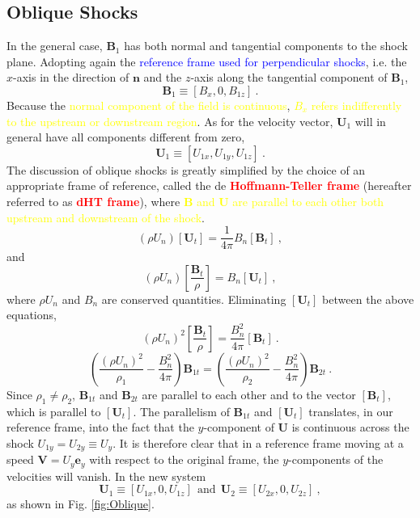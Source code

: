 \documentclass[12pt,a4paper]{article}
\renewcommand{\vec}[1]{\boldsymbol{#1}}
\begin{document}
\subsection{Oblique Shocks}
\cite{2015bps..book.....C} In the general case, $\vec{B}_1$ has both normal and tangential components to the shock plane. Adopting again the \textcolor{blue}{reference frame used for perpendicular shocks}, i.e. the $x$-axis in the direction of $\vec{n}$ and the $z$-axis along the tangential component of $\vec{B}_1$,
\begin{equation}
\vec{B}_1 \equiv [B_x, 0, B_{1z}] ~.
\end{equation}
Because the \textcolor{yellow}{normal component of the field is continuous}, \textcolor{yellow}{$B_x$ refers indifferently to the upstream or downstream region}. As for the velocity vector, $\vec{U}_1$ will in general have all components different from zero,
\begin{equation*}
\vec{U}_1 \equiv [U_{1x}, U_{1y}, U_{1z}] ~.
\end{equation*}
The discussion of oblique shocks is greatly simplified by the choice of an appropriate frame of reference, called the de \textcolor{red}{\bf Hoffmann-Teller frame} (hereafter referred to as \textcolor{red}{\bf dHT frame}), where \textcolor{yellow}{$\vec{B}$ and $\vec{U}$ are parallel to each other both upstream and downstream of the shock}. 
\begin{equation}
(\rho U_n) [\vec{U}_t] = \dfrac{1}{4\pi} B_n [\vec{B}_t] ~,
\end{equation}
and 
\begin{equation}
(\rho U_n) \left[\dfrac{\vec{B}_t}{\rho} \right] = B_n [\vec{U}_t] ~,
\end{equation}
where $\rho U_n$ and $B_n$ are conserved quantities. Eliminating $[\vec{U}_t]$ between the above equations, 
\begin{equation}
(\rho U_n)^2 \left[\dfrac{\vec{B}_t}{\rho} \right] = \dfrac{B_n^2}{4\pi} [\vec{B}_t] ~.
\end{equation}
\begin{equation}
\left(\dfrac{(\rho U_n)^2}{\rho_1} -\dfrac{B_n^2}{4\pi} \right) \vec{B}_{1t} = \left(\dfrac{(\rho U_n)^2}{\rho_2} -\dfrac{B_n^2}{4\pi} \right) \vec{B}_{2t} ~.
\end{equation}
Since $\rho_1 \neq \rho_2$, $\vec{B}_{1t}$ and $\vec{B}_{2t}$ are parallel to each other and to the vector $[\vec{B}_{t}]$, which is parallel to $[\vec{U}_{t}]$. The parallelism of $\vec{B}_{1t}$ and $[\vec{U}_t]$ translates, in our reference frame, into the fact that the $y$-component of $\vec{U}$ is continuous across the shock $U_{1y} = U_{2y} \equiv U_y$. It is therefore
clear that in a reference frame moving at a speed $\vec{V} = U_y \vec{e}_y$ with respect to the original frame, the $y$-components of the velocities will vanish. In the new system
\begin{equation}
\vec{U}_1 \equiv [U_{1x}, 0, U_{1z}] ~~\text{and}~~ \vec{U}_2 \equiv [U_{2x}, 0, U_{2z}] ~,
\end{equation}
as shown in Fig. \ref{fig:Oblique}.
\end{document}
